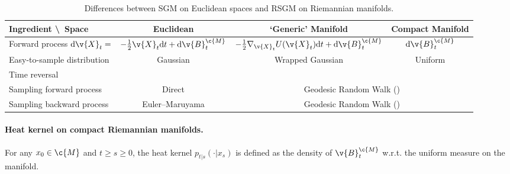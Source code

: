 \begin{table}[t]
	\small
	\centering
	\renewcommand*{\arraystretch}{1.2}
	\begin{tabular}{lccc}
		\toprule
		Ingredient \textbackslash ~Space                    & Euclidean                                                        & `Generic' Manifold                & Compact Manifold \\ \hline
		Forward process $\mathrm{d} \v{X}_t=$               & $- \tfrac{1}{2} \v{X}_t \mathrm{d} t + \mathrm{d} \v{B}_t^\c{M}$ & $ - \tfrac{1}{2} \nabla_{\v{X}_t}
		U(\v{X}_t) \mathrm{d} t + \mathrm{d} \v{B}_t^\c{M}$ & $\mathrm{d} \v{B}_t^\c{M}$                                                                                              \\ Easy-to-sample distribution & Gaussian & Wrapped Gaussian & Uniform \\ Time reversal & \textcite{cattiaux2021time} & \multicolumn{2}{c}{\Cref{thm:time_reversal_manifold}} \\ Sampling forward process & Direct & \multicolumn{2}{c}{Geodesic Random Walk (\Cref{alg:grw_rsgm})}\\ Sampling backward process & Euler--Maruyama & \multicolumn{2}{c}{Geodesic Random Walk (\Cref{alg:grw_rsgm})} \\ \bottomrule\end{tabular} \caption{\small Differences between SGM on Euclidean spaces and RSGM on Riemannian manifolds.
	}
	\label{tab:difference}
\end{table}

\paragraph{Heat kernel on compact Riemannian manifolds.}
For any $x_0 \in \c{M}$ and $t \geq s \geq 0$, the heat kernel $p_{t|s}(\cdot|x_s)$ is defined as the density of $\v{B}_t^\c{M}$ w.r.t. the uniform measure on the manifold.

